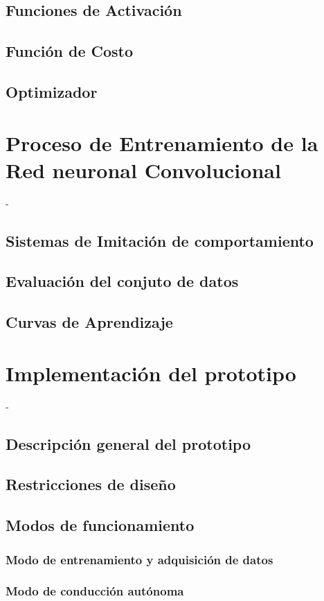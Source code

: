     \subsection{Funciones de Activación}
    \subsection{Función de Costo}
    \subsection{Optimizador}
    
\section{Proceso de Entrenamiento de la \\ Red neuronal Convolucional}
-
    \subsection{Sistemas de Imitación de comportamiento}
    \subsection{Evaluación del conjuto de datos}
    \subsection{Curvas de Aprendizaje}

\section{Implementación del prototipo}
- 
    \subsection{Descripción general del prototipo}
    \subsection{Restricciones de diseño}
    \subsection{Modos de funcionamiento}
        \subsubsection{Modo de entrenamiento y adquisición de datos}
        \subsubsection{Modo de conducción autónoma}
        